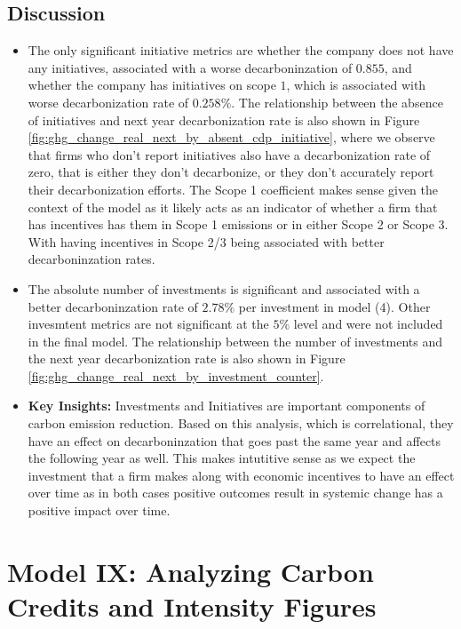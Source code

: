 \subsection{Discussion}

\begin{itemize}
    \item The only significant initiative metrics are whether the company does not have any initiatives, associated with a worse decarboninzation of $0.855$, and whether the company has initiatives on scope $1$, which is associated with worse decarbonization rate of $0.258\%$. The relationship between the absence of initiatives and next year decarbonization rate is also shown in Figure \ref{fig:ghg_change_real_next_by_absent_cdp_initiative}, where we observe that firms who don't report initiatives also have a decarbonization rate of zero, that is either they don't decarbonize, or they don't accurately report their decarbonization efforts. The Scope 1 coefficient makes sense given the context of the model as it likely acts as an indicator of whether a firm that has incentives has them in Scope 1 emissions or in either Scope 2 or Scope 3. With having incentives in Scope 2/3 being associated with better decarboninzation rates. 
    \item The absolute number of investments is significant and associated with a better decarboninzation rate of $2.78\%$ per investment in model (4). Other invesmtent metrics are not significant at the $5\%$ level and were not included in the final model. The relationship between the number of investments and the next year decarbonization rate is also shown in Figure \ref{fig:ghg_change_real_next_by_investment_counter}.
    \item \textbf{Key Insights:} Investments and Initiatives are important components of carbon emission reduction. Based on this analysis, which is correlational, they have an effect on decarboninzation that goes past the same year and affects the following year as well. This makes intutitive sense as we expect the investment that a firm makes along with economic incentives to have an effect over time as in both cases positive outcomes result in systemic change has a positive impact over time.
\end{itemize}

\section{Model IX: Analyzing Carbon Credits and Intensity Figures}

